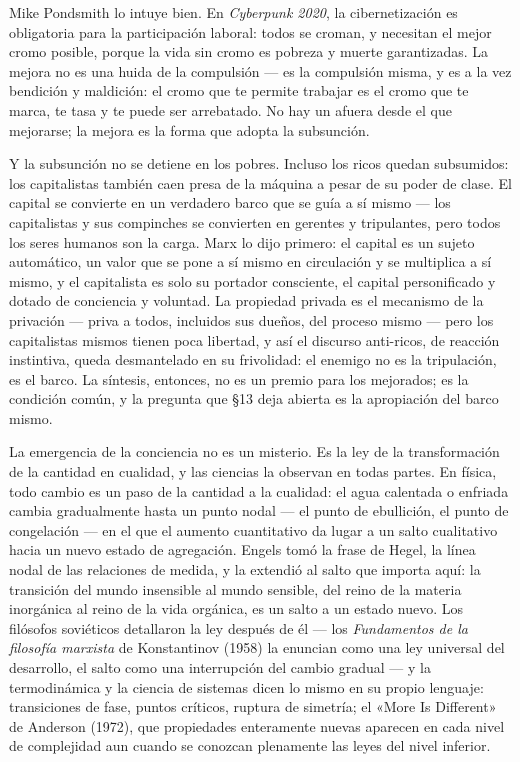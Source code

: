 \documentclass[11pt]{article}
\begin{document}
Mike Pondsmith lo intuye bien. En \textit{Cyberpunk 2020}, la
cibernetización es obligatoria para la participación laboral: todos se
croman, y necesitan el mejor cromo posible, porque la vida sin cromo es
pobreza y muerte garantizadas. La mejora no es una huida de la
compulsión --- es la compulsión misma, y es a la vez bendición y
maldición: el cromo que te permite trabajar es el cromo que te marca,
te tasa y te puede ser arrebatado. No hay un afuera desde el que
mejorarse; la mejora es la forma que adopta la subsunción.

Y la subsunción no se detiene en los pobres. Incluso los ricos quedan
subsumidos: los capitalistas también caen presa de la máquina a pesar de
su poder de clase. El capital se convierte en un verdadero barco que se
guía a sí mismo --- los capitalistas y sus compinches se convierten en
gerentes y tripulantes, pero todos los seres humanos son la carga. Marx
lo dijo primero: el capital es un sujeto automático, un valor que se pone
a sí mismo en circulación y se multiplica a sí mismo, y el capitalista
es solo su portador consciente, el capital personificado y dotado de
conciencia y voluntad. La propiedad privada es el mecanismo de la
privación --- priva a todos, incluidos sus dueños, del proceso mismo ---
pero los capitalistas mismos tienen poca libertad, y así el discurso
anti-ricos, de reacción instintiva, queda desmantelado en su frivolidad:
el enemigo no es la tripulación, es el barco. La síntesis, entonces, no
es un premio para los mejorados; es la condición común, y la pregunta
que §13 deja abierta es la apropiación del barco mismo.

La emergencia de la conciencia no es un misterio. Es la ley de la
transformación de la cantidad en cualidad, y las ciencias la observan
en todas partes. En física, todo cambio es un paso de la cantidad a la
cualidad: el agua calentada o enfriada cambia gradualmente hasta un
punto nodal --- el punto de ebullición, el punto de congelación --- en
el que el aumento cuantitativo da lugar a un salto cualitativo hacia un
nuevo estado de agregación. Engels tomó la frase de Hegel, la línea
nodal de las relaciones de medida, y la extendió al salto que importa
aquí: la transición del mundo insensible al mundo sensible, del reino
de la materia inorgánica al reino de la vida orgánica, es un salto a un
estado nuevo. Los filósofos soviéticos detallaron la ley después de
él --- los \textit{Fundamentos de la filosofía marxista} de Konstantinov
(1958) la enuncian como una ley universal del desarrollo, el salto como
una interrupción del cambio gradual --- y la termodinámica y la ciencia
de sistemas dicen lo mismo en su propio lenguaje: transiciones de fase,
puntos críticos, ruptura de simetría; el «More Is Different» de Anderson
(1972), que propiedades enteramente nuevas aparecen en cada nivel de
complejidad aun cuando se conozcan plenamente las leyes del nivel
inferior.
\end{document}
